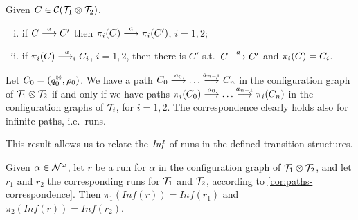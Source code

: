\begin{proposition}
\label{prop:edges-correspondence}
Given $C \in \mathcal{C}(\mathcal{T}_1 \otimes \mathcal{T}_2)$,
\begin{enumerate}[(i)]
	\item if $C \overset{a}{\longrightarrow} C'$ then $\pi_i(C) \overset{a}{\longrightarrow} \pi_i(C')$, $i = 1,2$;
	\label{sync-to-each}
	\item if $\pi_i(C) \overset{a}{\longrightarrow_{i}} C_i$, $i=1,2$, 
	then there is $C'$ s.t.\ $C\overset{a}{\longrightarrow} C'$ and $\pi_i(C) = C_i$.
	\label{each-to-sync}
\end{enumerate}
\end{proposition}
%
\begin{corollary}
\label{cor:paths-correspondence}
Let $C_0 = (q_0^{\otimes},\rho_0)$. We have a path $C_0 \overset{a_0}{\longrightarrow} \dots \overset{a_{n-1}}{\longrightarrow} C_n$ in the configuration graph of $\mathcal{T}_1 \otimes \mathcal{T}_2$ if and only if we have paths $\pi_i(C_0) \overset{a_0}{\longrightarrow} \dots \overset{a_{n-1}}{\longrightarrow} \pi_i(C_n)$ in the configuration graphs of $\mathcal{T}_i$, for $i=1,2$. The correspondence clearly holds also for infinite paths, i.e.\ runs.
\end{corollary}
%
This result allows us to relate the $\mathit{Inf}$ of runs in the defined transition structures.%
%
\begin{theorem}
\label{thm:inf-correspondence}
Given $\alpha \in \mathcal{N}^\omega$, let $r$ be a run for $\alpha$ in the configuration graph of $\mathcal{T}_1 \otimes \mathcal{T}_2$, and let $r_1$ and $r_2$ the corresponding 
runs for $\mathcal{T}_1$ and $\mathcal{T}_2$, according to \cref{cor:paths-correspondence}. Then $\pi_1(Inf(r)) = Inf(r_1)$ and $\pi_2(Inf(r)) = Inf(r_2)$.
\end{theorem}